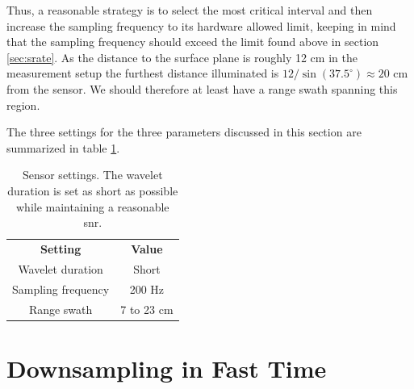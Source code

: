 Thus, a reasonable strategy is to select the most critical interval and then increase the sampling frequency to its hardware allowed limit, keeping in mind that the sampling frequency should exceed the limit found above in section \ref{sec:srate}. As the distance to the surface plane is roughly 12 cm in the measurement setup the furthest distance illuminated is $12/\sin(37.5^\circ)\approx 20$ cm from the sensor. We should therefore at least have a range swath spanning this region. 

The three settings for the three parameters discussed in this section are summarized in table \ref{tab:sensor_settings}.

\begin{table}
	\begin{center}
		\begin{tabular}{|c|c|}
			\hline
			\cellcolor{gray!150}\color{white}\textbf{Setting} & \cellcolor{gray!150}\color{white}\textbf{Value} \\
			Wavelet duration & Short \\
			\cellcolor{gray!25}Sampling frequency & \cellcolor{gray!25}200 Hz \\
			Range swath & 7 to 23 cm \\ 
			\hline
		\end{tabular}	
	\end{center}
	\caption{Sensor settings. The wavelet duration is set as short as possible while maintaining a reasonable \gls{snr}.}
	\label{tab:sensor_settings}
\end{table}

\section{Downsampling in Fast Time}
\label{downsampling}


